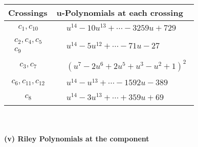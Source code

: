 \documentclass[1p]{elsarticle_modified}
\theoremstyle{definition}
\begin{document}
\begin{tabular}{m{50pt}|m{274pt}}
Crossings & \hspace{64pt}u-Polynomials at each crossing \\
\hline $$\begin{aligned}c_{1},c_{10}\end{aligned}$$&$\begin{aligned}
&u^{14}-10 u^{13}+\cdots-3259 u+729
\end{aligned}$\\
\hline $$\begin{aligned}c_{2},c_{4},c_{5}\\c_{9}\end{aligned}$$&$\begin{aligned}
&u^{14}-5 u^{12}+\cdots-71 u-27
\end{aligned}$\\
\hline $$\begin{aligned}c_{3},c_{7}\end{aligned}$$&$\begin{aligned}
&(u^7-2 u^6+2 u^5+u^3- u^2+1)^2
\end{aligned}$\\
\hline $$\begin{aligned}c_{6},c_{11},c_{12}\end{aligned}$$&$\begin{aligned}
&u^{14}- u^{13}+\cdots-1592 u-389
\end{aligned}$\\
\hline $$\begin{aligned}c_{8}\end{aligned}$$&$\begin{aligned}
&u^{14}-3 u^{13}+\cdots+359 u+69
\end{aligned}$\\
\hline
\end{tabular}\\~\\
\newpage\renewcommand{\arraystretch}{1}
\flushleft \textbf{(v) Riley Polynomials at the component}\newline \\
\end{document}
